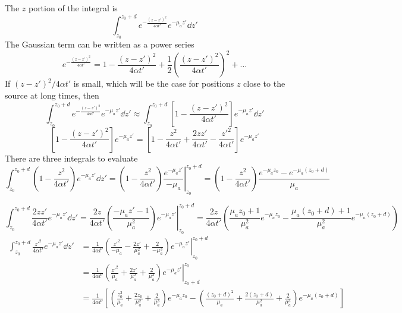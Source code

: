 \documentclass[]{article}
\begin{document}
The $z$ portion of the integral is
\begin{equation*}
    \int_{z_0}^{z_0 + d} e^{-\frac{(z-z')^2}{4\alpha t'}} e^{-\mu_a z'} \dd z'
\end{equation*}
The Gaussian term can be written as a power series
\begin{equation*}
  e^{-\frac{(z-z')^2}{4\alpha t'}} = 1 - \frac{(z-z')^2}{4\alpha t'} + \frac{1}{2}\left(\frac{(z-z')^2}{4\alpha t'}\right)^2 + \ldots
\end{equation*}
If $(z-z')^2/4\alpha t'$ is small, which will be the case for positions $z$ close
to the source at long times, then
\begin{equation*}
    \int_{z_0}^{z_0 + d} e^{-\frac{(z-z')^2}{4\alpha t'}} e^{-\mu_a z'} \dd z' \approx
    \int_{z_0}^{z_0 + d} \left[1 - \frac{(z-z')^2}{4\alpha t'}\right] e^{-\mu_a z'} \dd z'
\end{equation*}
\begin{equation*}
    \left[1 - \frac{(z-z')^2}{4\alpha t'}\right] e^{-\mu_a z'}
=   \left[1 - \frac{z^2}{4\alpha t'} + \frac{2zz'}{4\alpha t'} -\frac{z'^2}{4\alpha t'}\right] e^{-\mu_a z'}
\end{equation*}
There are three integrals to evaluate
\begin{equation*}
    \int_{z_0}^{z_0 + d}
   \left(1 -  \frac{z^2}{4\alpha t'}\right)e^{-\mu_a z'}
    \dd z' =
    \left.\left(1 -  \frac{z^2}{4\alpha t'}\right)\frac{e^{-\mu_a z'}}{-\mu_a} \right|_{z_0}^{z_0 + d}
    = \left(1 -  \frac{z^2}{4\alpha t'}\right)\frac{e^{-\mu_a z_0} - e^{-\mu_a (z_0+d)}}{\mu_a}
\end{equation*}

\begin{equation*}
    \int_{z_0}^{z_0 + d}
   \frac{2zz'}{4\alpha t'} e^{-\mu_a z'}
   \dd z'
   = \left.\frac{2z}{4\alpha t'} \left(\frac{-\mu_az' - 1}{\mu_a^2} \right)e^{-\mu_a z'} \right|_{z_0}^{z_0 + d}
     = \frac{2z}{4\alpha t'} \left( \frac{\mu_a z_0 + 1}{\mu_a^2}e^{-\mu_a z_0} - \frac{\mu_a (z_0+d) + 1}{\mu_a^2}e^{-\mu_a (z_0+d)}\right)
\end{equation*}
\begin{align*}
    \int_{z_0}^{z_0 + d}
   \frac{z'^2}{4\alpha t'} e^{-\mu_a z'}
   \dd z'
   &= \left.\frac{1}{4\alpha t'} \left( \frac{z'^2}{-\mu_a} - \frac{2z'}{\mu_a^2} + \frac{2}{-\mu_a^3} \right)e^{-\mu_a z'} \right|_{z_0}^{z_0 + d} \\
   &= \left.\frac{1}{4\alpha t'} \left( \frac{z'^2}{\mu_a} + \frac{2z'}{\mu_a^2} + \frac{2}{\mu_a^3} \right)e^{-\mu_a z'} \right|_{z_0 + d}^{z_0} \\
   &=
   \frac{1}{4\alpha t'}\left[
   \left( \frac{z_0^2}{\mu_a} + \frac{2z_0}{\mu_a^2} + \frac{2}{\mu_a^3} \right)e^{-\mu_a z_0} -
   \left( \frac{(z_0 + d)^2}{\mu_a} + \frac{2(z_0 + d)}{\mu_a^2} + \frac{2}{\mu_a^3} \right)e^{-\mu_a (z_0+d)}
   \right]
\end{align*}
\end{document}
